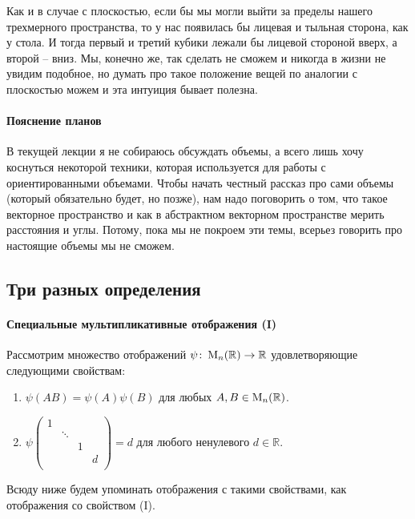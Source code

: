 Как и в случае с плоскостью, если бы мы могли выйти за пределы нашего трехмерного пространства, то у нас появилась бы лицевая и тыльная сторона, как у стола. И тогда первый и третий кубики лежали бы лицевой стороной вверх, а второй -- вниз. Мы, конечно же, так сделать не сможем и никогда в жизни не увидим подобное, но думать про такое положение вещей по аналогии с плоскостью можем и эта интуиция бывает полезна.

\paragraph{Пояснение планов}

В текущей лекции я не собираюсь обсуждать объемы, а всего лишь хочу коснуться некоторой техники, которая используется для работы с ориентированными объемами. Чтобы начать честный рассказ про сами объемы (который обязательно будет, но позже), нам надо поговорить о том, что такое векторное пространство и как в абстрактном векторном пространстве мерить расстояния и углы. Потому, пока мы не покроем эти темы, всерьез говорить про настоящие объемы мы не сможем.

\subsection{Три разных определения}

\paragraph{Специальные мультипликативные отображения (I)} 

Рассмотрим множество отображений $\psi\colon \operatorname{M}_{n}(\mathbb R)\to \mathbb R$ удовлетворяющие следующими свойствам:
\begin{enumerate}
\item $\psi(AB) = \psi(A)\psi(B)$ для любых $A,B\in\operatorname{M}_{n}(\mathbb R)$.

\item 
$
\psi
\begin{pmatrix}
{1}&{}&{}&{}\\
{}&{\ddots}&{}&{}\\
{}&{}&{1}&{}\\
{}&{}&{}&{d}\\
\end{pmatrix}
= 
d
$ для любого ненулевого $d\in\mathbb R$.
\end{enumerate}
Всюду ниже будем упоминать отображения с такими свойствами, как отображения со свойством (I).

